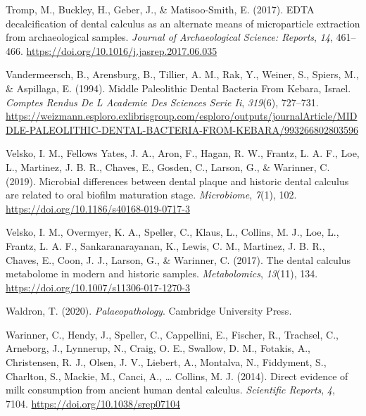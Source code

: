 \documentclass[
  letterpaper,
]{book}
\newlength{\cslhangindent}
\newlength{\cslentryspacingunit} %
\newenvironment{CSLReferences}[2] %
 {%
  \setlength{\parindent}{0pt}
  \ifodd #1
  \let\oldpar\par
  \def\par{\hangindent=\cslhangindent\oldpar}
  \fi
  \setlength{\parskip}{#2\cslentryspacingunit}
 }%
 {}
\begin{document}
\begin{CSLReferences}{1}{0}
\leavevmode{}%
Tromp, M., Buckley, H., Geber, J., \& Matisoo-Smith, E. (2017). {EDTA}
decalcification of dental calculus as an alternate means of
microparticle extraction from archaeological samples. \emph{Journal of
Archaeological Science: Reports}, \emph{14}, 461--466.
\url{https://doi.org/10.1016/j.jasrep.2017.06.035}

\leavevmode{}%
Vandermeersch, B., Arensburg, B., Tillier, A. M., Rak, Y., Weiner, S.,
Spiers, M., \& Aspillaga, E. (1994). Middle {Paleolithic Dental Bacteria
From Kebara}, {Israel}. \emph{Comptes Rendus De L Academie Des Sciences
Serie Ii}, \emph{319}(6), 727--731.
\url{https://weizmann.esploro.exlibrisgroup.com/esploro/outputs/journalArticle/MIDDLE-PALEOLITHIC-DENTAL-BACTERIA-FROM-KEBARA/993266802803596}

\leavevmode{}%
Velsko, I. M., Fellows Yates, J. A., Aron, F., Hagan, R. W., Frantz, L.
A. F., Loe, L., Martinez, J. B. R., Chaves, E., Gosden, C., Larson, G.,
\& Warinner, C. (2019). Microbial differences between dental plaque and
historic dental calculus are related to oral biofilm maturation stage.
\emph{Microbiome}, \emph{7}(1), 102.
\url{https://doi.org/10.1186/s40168-019-0717-3}

\leavevmode{}%
Velsko, I. M., Overmyer, K. A., Speller, C., Klaus, L., Collins, M. J.,
Loe, L., Frantz, L. A. F., Sankaranarayanan, K., Lewis, C. M., Martinez,
J. B. R., Chaves, E., Coon, J. J., Larson, G., \& Warinner, C. (2017).
The dental calculus metabolome in modern and historic samples.
\emph{Metabolomics}, \emph{13}(11), 134.
\url{https://doi.org/10.1007/s11306-017-1270-3}

\leavevmode{}%
Waldron, T. (2020). \emph{Palaeopathology}. {Cambridge University
Press}.

\leavevmode{}%
Warinner, C., Hendy, J., Speller, C., Cappellini, E., Fischer, R.,
Trachsel, C., Arneborg, J., Lynnerup, N., Craig, O. E., Swallow, D. M.,
Fotakis, A., Christensen, R. J., Olsen, J. V., Liebert, A., Montalva,
N., Fiddyment, S., Charlton, S., Mackie, M., Canci, A., \ldots{}
Collins, M. J. (2014). Direct evidence of milk consumption from ancient
human dental calculus. \emph{Scientific Reports}, \emph{4}, 7104.
\url{https://doi.org/10.1038/srep07104}


\end{CSLReferences}
\end{document}
